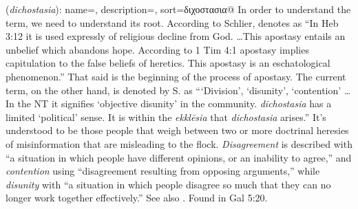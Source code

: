 \item[Disunity,]

(\textit{dichostasia}):
{
    name=,
    description={},
    sort=διχοστασια@
}
In order to understand the term, we need to understand its root. 
According to Schlier,  denotes as ``In Heb 3:12 it is used expressly of religious decline from God. \ldots This apostasy entails an unbelief which abandons hope. According to 1 Tim 4:1 apostasy implies capitulation to the false beliefs of heretics. This apostasy is an eschatological phenomenon.'' 
That said is the beginning of the process of apostasy. The current term, on the other hand, is denoted by S. as ```Division', `disunity', `contention' \ldots In the NT it signifies `objective disunity' in the community. \emph{dichostasia} has a limited `political' sense. It is within the \emph{ekklēsia} that \emph{dichostasia} arises.'' 
It's understood to be those people that weigh between two or more doctrinal heresies of misinformation that are misleading to the flock. \emph{Disagreement} is described with ``a situation in which people have different opinions, or an inability to agree,'' and \emph{contention} using ``disagreement resulting from opposing arguments,'' while \emph{disunity} with ``a situation in which people disagree so much that they can no longer work together effectively.'' See also .
Found in Gal 5:20.
